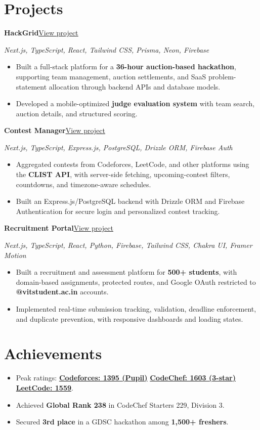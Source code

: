 \documentclass[letterpaper,11pt]{article}
\newcommand{\project}[3]{%
  \textbf{#1}\hfill\href{#3}{\underline{View project}}\par
  {\small\textit{#2}}\par}
\begin{document}
\section{Projects}
\project{HackGrid}{Next.js, TypeScript, React, Tailwind CSS, Prisma, Neon, Firebase}{https://www.adgvit.com/}
\begin{itemize}
  \item Built a full-stack platform for a \textbf{36-hour auction-based hackathon}, supporting team management, auction settlements, and SaaS problem-statement allocation through backend APIs and database models.
  \item Developed a mobile-optimized \textbf{judge evaluation system} with team search, auction details, and structured scoring.
\end{itemize}
\vspace{2pt}
\project{Contest Manager}{Next.js, TypeScript, Express.js, PostgreSQL, Drizzle ORM, Firebase Auth}{https://contest-manager.vercel.app}
\begin{itemize}
  \item Aggregated contests from Codeforces, LeetCode, and other platforms using the \textbf{CLIST API}, with server-side fetching, upcoming-contest filters, countdowns, and timezone-aware schedules.
  \item Built an Express.js/PostgreSQL backend with Drizzle ORM and Firebase Authentication for secure login and personalized contest tracking.
\end{itemize}
\vspace{2pt}
\project{Recruitment Portal}{Next.js, TypeScript, React, Python, Firebase, Tailwind CSS, Chakra UI, Framer Motion}{https://adgvit.in/}
\begin{itemize}
  \item Built a recruitment and assessment platform for \textbf{500+ students}, with domain-based assignments, protected routes, and Google OAuth restricted to \textbf{@vitstudent.ac.in} accounts.
  \item Implemented real-time submission tracking, validation, deadline enforcement, and duplicate prevention, with responsive dashboards and loading states.
\end{itemize}

\section{Achievements}
\begin{itemize}
  \item Peak ratings: \href{https://codeforces.com/profile/aarav_g_168}{\textbf{Codeforces: 1395 (Pupil)}}\enspace\textbar\enspace
    \href{https://www.codechef.com/users/aarav1608}{\textbf{CodeChef: 1603 (3-star)}}\enspace\textbar\enspace
    \href{https://leetcode.com/u/aarav_g_168/}{\textbf{LeetCode: 1559}}.
  \item Achieved \textbf{Global Rank 238} in CodeChef Starters 229, Division 3.
  \item Secured \textbf{3rd place} in a GDSC hackathon among \textbf{1,500+ freshers}.
\end{itemize}
\end{document}
